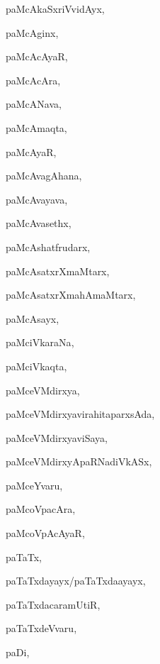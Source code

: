 \begin{multicols}{3}
{\noindent
{paMcAkaSxriVvidAyx}, \pageref{paMcAkaSxriVvidAyx}

\noindent
{paMcAginx}, \pageref{paMcAginx}

\noindent
{paMcAcAyaR}, \pageref{paMcAcAyaR}

\noindent
{paMcAcAra}, \pageref{paMcAcAra}

\noindent
{paMcANava}, \pageref{paMcANava}

\noindent
{paMcAmaqta}, \pageref{paMcAmaqta}

\noindent
{paMcAyaR}, \pageref{paMcAyaR}

\noindent
{paMcAvagAhana}, \pageref{paMcAvagAhana}

\noindent
{paMcAvayava}, \pageref{paMcAvayava}

\noindent
{paMcAvasethx}, \pageref{paMcAvasethx}

\noindent
{paMcAshatfrudarx}, \pageref{paMcAshatfrudarx}

\noindent
{paMcAsatxrXmaMtarx}, \pageref{paMcAsatxrXmaMtarx}

\noindent
{paMcAsatxrXmahAmaMtarx}, \pageref{paMcAsatxrXmahAmaMtarx}

\noindent
{paMcAsayx}, \pageref{paMcAsayx}

\noindent
{paMciVkaraNa}, \pageref{paMciVkaraNa}

\noindent
{paMciVkaqta}, \pageref{paMciVkaqta}

\noindent
{paMceVMdirxya}, \pageref{paMceVMdirxya}

\noindent
{paMceVMdirxyavirahitaparxsAda}, \pageref{paMceVMdirxyavirahitaparxsAda}

\noindent
{paMceVMdirxyaviSaya}, \pageref{paMceVMdirxyaviSaya}

\noindent
{paMceVMdirxyApaRNadiVkASx}, \pageref{paMceVMdirxyApaRNadiVkASx}

\noindent
{paMceYvaru}, \pageref{paMceYvaru}

\noindent
{paMcoVpacAra}, \pageref{paMcoVpacAra}

\noindent
{paMcoVpAcAyaR}, \pageref{paMcoVpAcAyaR}

\noindent
{paTaTx}, \pageref{paTaTx}

\noindent
{paTaTxdayayx/paTaTxda{a}yayx}, \pageref{paTaTxdayayxpaTaTxdaayayx}

\noindent
{paTaTxdacaramUtiR}, \pageref{paTaTxdacaramUtiR}

\noindent
{paTaTxdeVvaru}, \pageref{paTaTxdeVvaru}

\noindent
{paDi}, \pageref{paDi}

}
\end{multicols}
